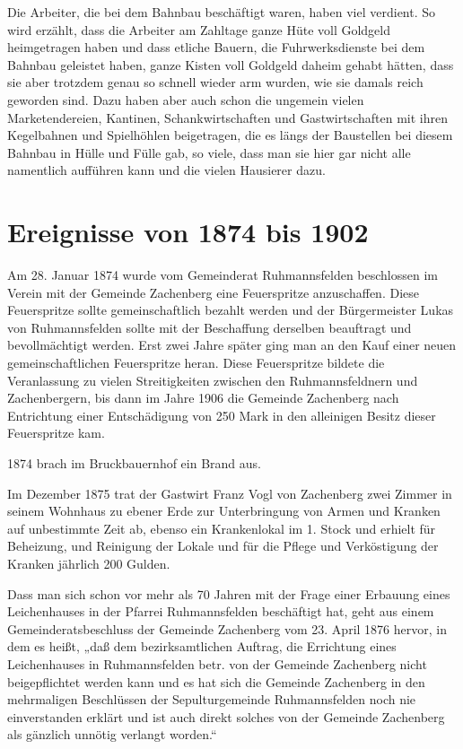 \documentclass{book}
\begin{document}
Die Arbeiter, die bei dem Bahnbau beschäftigt waren, haben viel verdient. So
wird erzählt, dass die Arbeiter am Zahltage ganze Hüte voll Goldgeld
heimgetragen haben und dass etliche Bauern, die Fuhrwerksdienste bei dem Bahnbau
geleistet haben, ganze Kisten voll Goldgeld daheim gehabt hätten, dass sie aber
trotzdem genau so schnell wieder arm wurden, wie sie damals reich geworden sind.
Dazu haben aber auch schon die ungemein vielen Marketendereien, Kantinen,
Schankwirtschaften und Gastwirtschaften mit ihren Kegelbahnen und Spielhöhlen
beigetragen, die es längs der Baustellen bei diesem Bahnbau in Hülle und Fülle
gab, so viele, dass man sie hier gar nicht alle namentlich aufführen kann und
die vielen Hausierer dazu.

\section{Ereignisse von 1874 bis 1902}

Am 28. Januar 1874 wurde vom Gemeinderat Ruhmannsfelden beschlossen im Verein
mit der Gemeinde Zachenberg eine Feuerspritze anzuschaffen. Diese Feuerspritze
sollte gemeinschaftlich bezahlt werden und der Bürgermeister Lukas von
Ruhmannsfelden sollte mit der Beschaffung derselben beauftragt und
bevollmächtigt werden. Erst zwei Jahre später ging man an den Kauf einer neuen
gemeinschaftlichen Feuerspritze heran. Diese Feuerspritze bildete die
Veranlassung zu vielen Streitigkeiten zwischen den Ruhmannsfeldnern und
Zachenbergern, bis dann im Jahre 1906 die Gemeinde Zachenberg nach Entrichtung
einer Entschädigung von 250 Mark in den alleinigen Besitz dieser Feuerspritze
kam.

1874 brach im Bruckbauernhof ein Brand aus.

Im Dezember 1875 trat der Gastwirt Franz Vogl von Zachenberg zwei Zimmer in
seinem Wohnhaus zu ebener Erde zur Unterbringung von Armen und Kranken auf
unbestimmte Zeit ab, ebenso ein Krankenlokal im 1. Stock und erhielt für
Beheizung, und Reinigung der Lokale und für die Pflege und Verköstigung der
Kranken jährlich 200 Gulden.

Dass man sich schon vor mehr als 70 Jahren mit der Frage einer Erbauung eines
Leichenhauses in der Pfarrei Ruhmannsfelden beschäftigt hat, geht aus einem
Gemeinderatsbeschluss der Gemeinde Zachenberg vom 23. April 1876 hervor, in dem
es heißt, „daß dem bezirksamtlichen Auftrag, die Errichtung eines Leichenhauses
in Ruhmannsfelden betr. von der Gemeinde Zachenberg nicht beigepflichtet werden
kann und es hat sich die Gemeinde Zachenberg in den mehrmaligen Beschlüssen der
Sepulturgemeinde Ruhmannsfelden noch nie einverstanden erklärt und ist auch
direkt solches von der Gemeinde Zachenberg als gänzlich unnötig verlangt
worden.“
\end{document}
